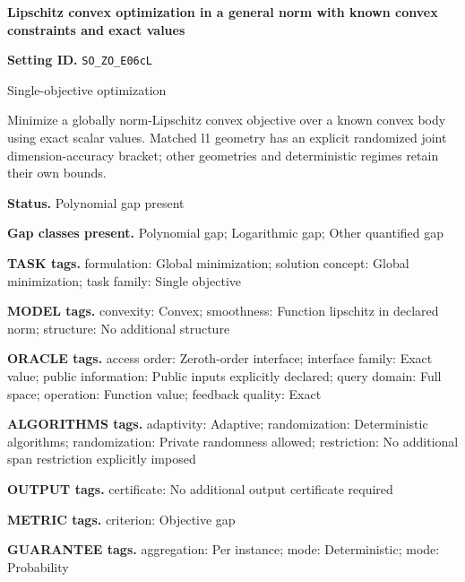 \documentclass[10pt,a4paper]{article}
\begin{document}
\raggedright

{\LARGE\bfseries\sffamily\color{AtlasNavy} Lipschitz convex optimization in a general norm with known convex constraints and exact values\par}\vspace{5pt}


\textbf{Setting ID.} \texttt{SO\_\allowbreak{}ZO\_\allowbreak{}E06cL}



Single-objective optimization



Minimize a globally norm-Lipschitz convex objective over a known convex body using exact scalar values. Matched l1 geometry has an explicit randomized joint dimension-accuracy bracket; other geometries and deterministic regimes retain their own bounds.



\textbf{Status.} Polynomial gap present



\textbf{Gap classes present.} Polynomial gap; Logarithmic gap; Other quantified gap



\textbf{TASK tags.} formulation: Global minimization; solution concept: Global minimization; task family: Single objective



\textbf{MODEL tags.} convexity: Convex; smoothness: Function lipschitz in declared norm; structure: No additional structure



\textbf{ORACLE tags.} access order: Zeroth-order interface; interface family: Exact value; public information: Public inputs explicitly declared; query domain: Full space; operation: Function value; feedback quality: Exact



\textbf{ALGORITHMS tags.} adaptivity: Adaptive; randomization: Deterministic algorithms; randomization: Private randomness allowed; restriction: No additional span restriction explicitly imposed



\textbf{OUTPUT tags.} certificate: No additional output certificate required



\textbf{METRIC tags.} criterion: Objective gap



\textbf{GUARANTEE tags.} aggregation: Per instance; mode: Deterministic; mode: Probability
\end{document}
